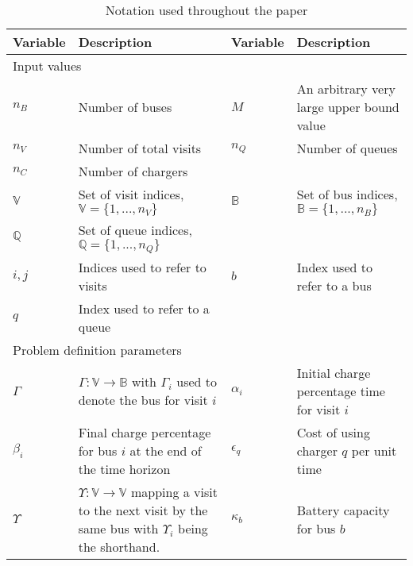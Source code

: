 \begin{table}[!ht]
	\caption{Notation used throughout the paper}
	\label{tab:variables}
	\centering
	\begin{tabular}{l l l l}
		\toprule
		\textbf{Variable} & \textbf{Description} & \textbf{Variable} & \textbf{Description} \\
		\toprule
		\multicolumn{4}{l}{Input values}                                  \\
			$n_B$         & Number of buses                     &
			$M$           & An arbitrary very large upper bound value \\
			$n_V$           & Number of total visits                    &
			$n_Q$           & Number of queues                        \\
			$n_C$ 			& Number of chargers \\
			$\mathbb{V}$  & Set of visit indices, $\mathbb{V} = \{1, ..., n_V\}$ 			  &
			$\mathbb{B}$  & Set of bus indices, $\mathbb{B} = \{1, ..., n_B\}$ 			 \\
			$\mathbb{Q}$  & Set of queue indices, $\mathbb{Q} = \{1, ..., n_Q\}$ \\
			$i,j$      	& Indices used to refer to visits &
			$b$ 		& Index used to refer to a bus \\
			$q$ 		& Index used to refer to a queue \\
		\hline
		\multicolumn{4}{l}{Problem definition parameters} \\
			$\Gamma$   & $\Gamma: \mathbb{V} \rightarrow \mathbb{B}$ with $\Gamma_i$ used to denote the bus for visit $i$                                   &
			$\alpha_i$   & Initial charge percentage time for visit $i$                       \\
			$\beta_i$    & Final charge percentage for bus $i$ at the end of the time horizon &
			$\epsilon_q$ & Cost of using charger $q$ per unit time                            \\
			$\Upsilon$   & $\Upsilon: \mathbb{V} \rightarrow \mathbb{V}$ mapping a visit to the next visit by the same bus with $\Upsilon_i$ being the shorthand. &
			$\kappa_b$   & Battery capacity for bus $b$                                       \\

\end{tabular}
\end{table}
